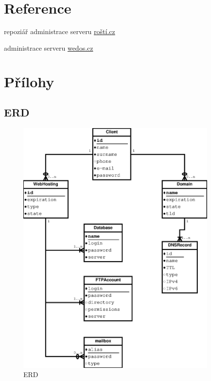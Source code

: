 \documentclass[11pt,a4paper]{article}
\begin{document}
  \section{Reference}

    \begin{enumerate}[label={[\arabic*]}]
      \item repoziář administrace serveru \href{https://github.com/creckx/pcp}
                                               {roští.cz}
      \item administrace serveru \href{https://wedos.cz}{wedos.cz}
    \end{enumerate}

  \appendix
  \newpage

  \section{Přílohy}

    \subsection{ERD}

      \begin{figure}[ht]
        \begin{center}
          \includegraphics[width=10cm]{erd}
          \caption{ERD}
        \end{center}
      \end{figure}
\end{document}
